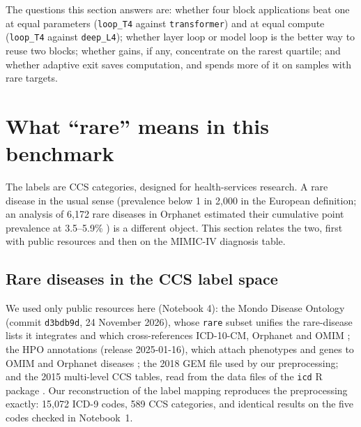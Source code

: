 \documentclass[11pt]{article}
\begin{document}
The questions this section answers are: whether four block applications beat one at equal parameters (\texttt{loop\_T4}
against \texttt{transformer}) and at equal compute (\texttt{loop\_T4} against \texttt{deep\_L4}); whether layer loop or
model loop is the better way to reuse two blocks; whether gains, if any, concentrate on the rarest quartile; and
whether adaptive exit saves computation, and spends more of it on samples with rare targets.

\section{What ``rare'' means in this benchmark}\label{sec:rare}

The labels are CCS categories, designed for health-services research. A rare disease in the usual sense
(prevalence below 1 in 2,000 in the European definition; an analysis of 6,172 rare diseases in Orphanet estimated
their cumulative point prevalence at 3.5--5.9\% \citep{nguengang2020prevalence}) is a different object. This
section relates the two, first with public resources and then on the MIMIC-IV diagnosis table.

\subsection{Rare diseases in the CCS label space}

We used only public resources here (Notebook 4): the Mondo Disease Ontology
(commit \texttt{d3bdb9d}, 24 November 2026), whose \texttt{rare} subset unifies the rare-disease lists it
integrates and which cross-references ICD-10-CM, Orphanet and OMIM \citep{vasilevsky2026mondo}; the HPO
annotations (release 2025-01-16), which attach phenotypes and genes to OMIM and Orphanet diseases
\citep{gargano2024hpo}; the 2018 GEM file used by our preprocessing; and the 2015 multi-level CCS tables, read
from the data files of the \texttt{icd} R package \citep{wasey_icd}. Our reconstruction of the label mapping
reproduces the preprocessing exactly: 15,072 ICD-9 codes, 589 CCS categories, and identical results on the five
codes checked in Notebook~1.
\end{document}
